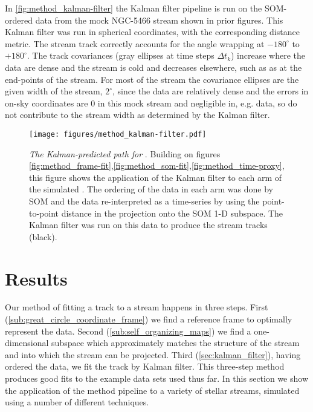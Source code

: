 \documentclass[fleqn,usenatbib]{mnras}
\begin{document}
    In \autoref{fig:method_kalman-filter} the Kalman filter pipeline is run on
    the SOM-ordered data from the mock NGC-5466 stream shown in prior figures.
    This Kalman filter was run in spherical coordinates, with the corresponding
    distance metric. The stream track correctly accounts for the angle wrapping
    at $-180^\circ$ to $+180^\circ$. The track covariances (gray ellipses at
    time steps $\Delta t_k$) increase where the data are dense and the stream is
    cold and decreases elsewhere, such as as at the end-points of the stream.
    For most of the stream the covariance ellipses are the given width of the
    stream, $2^\circ$, since the data are relatively dense and the errors in
    on-sky coordinates are 0 in this mock stream and negligible in, e.g. \gaia{}
    data, so do not contribute to the stream width as determined by the Kalman
    filter.

    \begin{figure}
      \centering
      \texttt{[image: figures/method\_kalman-filter.pdf]}
      \caption{
        \emph{The Kalman-predicted path for }.
        Building on figures
        \ref{fig:method_frame-fit},\ref{fig:method_som-fit},\ref{fig:method_time-proxy},
        this figure shows the application of the Kalman filter to each arm of
        the simulated . The ordering of the data in each arm
        was done by SOM and the data re-interpreted as a time-series by using
        the point-to-point distance in the projection onto the SOM 1-D subspace.
        The Kalman filter was run on this data to produce the stream tracks
        (black). }
      \label{fig:method_kalman-filter}
    \end{figure}




\section{Results} \label{sec:results}

  Our method of fitting a track to a stream happens in three steps. First
  (\autoref{sub:great_circle_coordinate_frame}) we find a reference frame to
  optimally represent the data. Second (\autoref{sub:self_organizing_maps}) we
  find a one-dimensional subspace which approximately matches the structure of
  the stream and into which the stream can be projected. Third
  (\autoref{sec:kalman_filter}), having ordered the data, we fit the track by
  Kalman filter. This three-step method produces good fits to the example data
  sets used thus far. In this section we show the application of the method
  pipeline to a variety of stellar streams, simulated using a number of
  different techniques.
\end{document}
